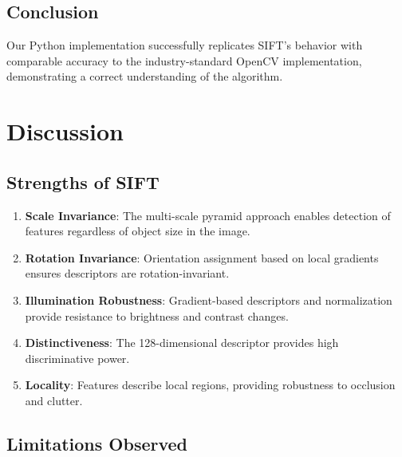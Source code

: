 \documentclass[12pt,a4paper]{article}
\begin{document}
\subsection{Conclusion}
Our Python implementation successfully replicates SIFT's behavior with comparable accuracy to the industry-standard OpenCV implementation, demonstrating a correct understanding of the algorithm.

\section{Discussion}

\subsection{Strengths of SIFT}

\begin{enumerate}
    \item \textbf{Scale Invariance}: The multi-scale pyramid approach enables detection of features regardless of object size in the image.
    
    \item \textbf{Rotation Invariance}: Orientation assignment based on local gradients ensures descriptors are rotation-invariant.
    
    \item \textbf{Illumination Robustness}: Gradient-based descriptors and normalization provide resistance to brightness and contrast changes.
    
    \item \textbf{Distinctiveness}: The 128-dimensional descriptor provides high discriminative power.
    
    \item \textbf{Locality}: Features describe local regions, providing robustness to occlusion and clutter.
\end{enumerate}

\subsection{Limitations Observed}
\end{document}

